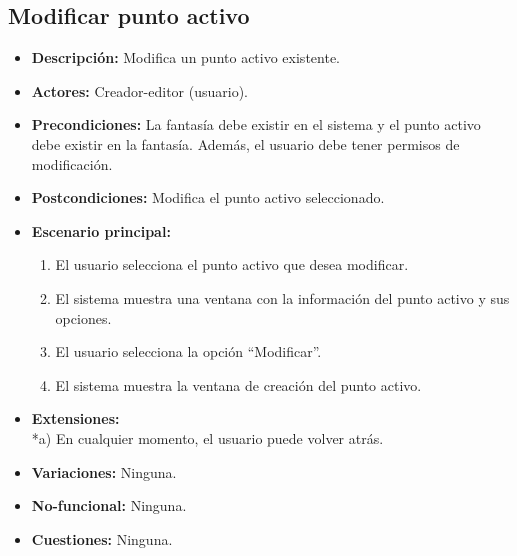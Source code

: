 \subsection{Modificar punto activo}
\begin{itemize}
	\item \textbf{Descripción:} Modifica un punto activo existente.
	\item \textbf{Actores:} Creador-editor (usuario).
	\item \textbf{Precondiciones:} La fantasía debe existir en el sistema y el punto activo debe existir en la fantasía. Además, el usuario debe tener permisos de modificación.
	\item \textbf{Postcondiciones:} Modifica el punto activo seleccionado.
	\item \textbf{Escenario principal:}
	\begin{enumerate}
		\item El usuario selecciona el punto activo que desea modificar.
		\item El sistema muestra una ventana con la información del punto activo y sus opciones.
		\item El usuario selecciona la opción ``Modificar''.
		\item El sistema muestra la ventana de creación del punto activo.
	\end{enumerate}
	\item \textbf{Extensiones:} \\ *a) En cualquier momento, el usuario puede volver atrás.
	\item \textbf{Variaciones:} Ninguna.
	\item \textbf{No-funcional:} Ninguna.
	\item \textbf{Cuestiones:} Ninguna.
\end{itemize}

